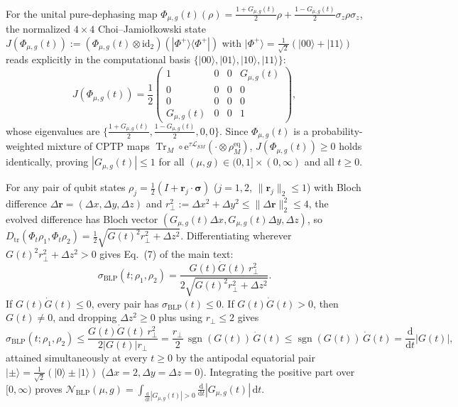 \documentclass[onecolumn,10pt,notitlepage,amsmath,amssymb,floatfix]{revtex4-2}
\theoremstyle{plain}
\theoremstyle{definition}
\newcommand{\dd}{\mathrm{d}}
\newcommand{\ee}{\mathrm{e}}
\newcommand{\Tr}{\operatorname{Tr}}
\newcommand{\sgn}{\operatorname{sgn}}
\newcommand{\NBLP}{\mathcal{N}_{\mathrm{BLP}}}
\begin{document}
For the unital pure-dephasing map $\Phi_{\mu,g}(t)(\rho) = \frac{1+G_{\mu,g}(t)}{2}\rho + \frac{1-G_{\mu,g}(t)}{2}\sigma_z\rho\sigma_z$, the normalized $4\times 4$ Choi--Jamio\l kowski state $J(\Phi_{\mu,g}(t)) := (\Phi_{\mu,g}(t)\otimes \mathrm{id}_2)(|\Phi^+\rangle\langle\Phi^+|)$ with $|\Phi^+\rangle = \frac{1}{\sqrt{2}}(|00\rangle + |11\rangle)$ reads explicitly in the computational basis $\{|00\rangle, |01\rangle, |10\rangle, |11\rangle\}$:
\begin{equation}
\label{eq:S1_choi}
J(\Phi_{\mu,g}(t)) = \frac{1}{2}\begin{pmatrix} 1 & 0 & 0 & G_{\mu,g}(t) \\ 0 & 0 & 0 & 0 \\ 0 & 0 & 0 & 0 \\ G_{\mu,g}(t) & 0 & 0 & 1 \end{pmatrix},
\end{equation}
whose eigenvalues are $\big\{\frac{1+G_{\mu,g}(t)}{2}, \frac{1-G_{\mu,g}(t)}{2}, 0, 0\big\}$. Since $\Phi_{\mu,g}(t)$ is a probability-weighted mixture of CPTP maps $\Tr_M \circ \ee^{\tau\mathcal{L}_{SM}}(\cdot\otimes\rho_M^{\mathrm{eq}})$, $J(\Phi_{\mu,g}(t)) \ge 0$ holds identically, proving $|G_{\mu,g}(t)| \le 1$ for all $(\mu,g) \in (0,1]\times (0,\infty)$ and all $t \ge 0$.

For any pair of qubit states $\rho_j = \frac{1}{2}(I + \mathbf{r}_j\cdot\boldsymbol{\sigma})$ ($j=1,2$, $\|\mathbf{r}_j\|_2 \le 1$) with Bloch difference $\Delta\mathbf{r} = (\Delta x, \Delta y, \Delta z)$ and $r_\perp^2 := \Delta x^2 + \Delta y^2 \le \|\Delta\mathbf{r}\|_2^2 \le 4$, the evolved difference has Bloch vector $(G_{\mu,g}(t)\Delta x, G_{\mu,g}(t)\Delta y, \Delta z)$, so $D_{\mathrm{tr}}(\Phi_t\rho_1, \Phi_t\rho_2) = \frac{1}{2}\sqrt{G(t)^2 r_\perp^2 + \Delta z^2}$. Differentiating wherever $G(t)^2 r_\perp^2 + \Delta z^2 > 0$ gives Eq.~(7) of the main text:
\begin{equation}
\label{eq:S1_sigma_blp}
\sigma_{\mathrm{BLP}}(t; \rho_1, \rho_2) = \frac{G(t)\dot{G}(t)\,r_\perp^2}{2\sqrt{G(t)^2 r_\perp^2 + \Delta z^2}}.
\end{equation}
If $G(t)\dot{G}(t) \le 0$, every pair has $\sigma_{\mathrm{BLP}}(t) \le 0$. If $G(t)\dot{G}(t) > 0$, then $G(t) \neq 0$, and dropping $\Delta z^2 \ge 0$ plus using $r_\perp \le 2$ gives
\[
\sigma_{\mathrm{BLP}}(t; \rho_1, \rho_2)
\le \frac{G(t)\dot{G}(t)\,r_\perp^2}{2|G(t)| r_\perp}
= \frac{r_\perp}{2}\,\sgn(G(t))\,\dot{G}(t)
\le \sgn(G(t))\,\dot{G}(t) = \frac{\dd}{\dd t}|G(t)|,
\]
attained simultaneously at every $t \ge 0$ by the antipodal equatorial pair $|\pm\rangle = \frac{1}{\sqrt{2}}(|0\rangle\pm |1\rangle)$ ($\Delta x = 2, \Delta y = \Delta z = 0$). Integrating the positive part over $[0,\infty)$ proves $\NBLP(\mu,g) = \int_{\frac{\dd}{\dd t}|G_{\mu,g}(t)| > 0} \frac{\dd}{\dd t}|G_{\mu,g}(t)|\,\dd t$.
\end{document}
